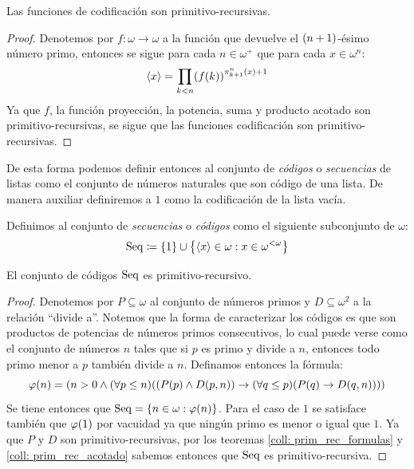 \begin{theorem}
	\label{theo: codificacion_primitiva} %
	Las funciones de codificación son primitivo-recursivas.
\end{theorem}

\begin{proof}
	Denotemos por $f:\omega\to\omega$ a la función que devuelve el $\pa*{n + 1}$-ésimo número primo, entonces se sigue para cada $n\in\omega^{+}$ que para cada $x\in\omega^{n}$:
	\[
		\inner*{x} =\prod_{k < n}\pa*{f\pa*{k}}^{\PROYECCION{n}{k + 1}\pa*{x} + 1}
	\]
	Ya que $f$, la función proyección, la potencia, suma y producto acotado son primitivo-recursivas, se sigue que las funciones codificación son primitivo-recursivas.
\end{proof}

De esta forma podemos definir entonces al conjunto de \emph{códigos} o \emph{secuencias} de listas como el conjunto de números naturales que son código de una lista. De manera auxiliar definiremos a $1$ como la codificación de la lista vacía.

\begin{definition}[Secuencias]
	Definimos al conjunto de \emph{secuencias} o \emph{códigos} como el siguiente subconjunto de $\omega$:
	\[
		\SECUENCIAS\coloneqq\set*{1}\cup\set*{\inner*{x}\in\omega: x\in\omega^{<\omega}}
	\]
\end{definition}

\begin{theorem}
	El conjunto de códigos $\SECUENCIAS$ es primitivo-recursivo.
\end{theorem}

\begin{proof}
	Denotemos por $P\subseteq\omega$ al conjunto de números primos y $D\subseteq\omega^{2}$ a la relación ``divide a''. Notemos que la forma de caracterizar los códigos es que son productos de potencias de números primos consecutivos, lo cual puede verse como el conjunto de números $n$ tales que si $p$ es primo y divide a $n$, entonces todo primo menor a $p$ también divide a $n$. Definamos entonces la fórmula:
	\[
		\varphi\pa*{n} =\pa*{n > 0\land\pa*{\forall p\leq n}\pa*{\pa*{P\pa*{p}\land D\pa*{p, n}}\to\pa*{\forall q\leq p}\pa*{P\pa*{q}\to D\pa*{q, n}}}}
	\]
	Se tiene entonces que $\SECUENCIAS =\set*{n\in\omega:\varphi\pa*{n}}$. Para el caso de $1$ se satisface también que $\varphi\pa*{1}$ por vacuidad ya que ningún primo es menor o igual que $1$. Ya que $P$ y $D$ son primitivo-recursivas, por los teoremas \ref{coll: prim_rec_formulas} y \ref{coll: prim_rec_acotado} sabemos entonces que $\SECUENCIAS$ es primitivo-recursiva.
\end{proof}

